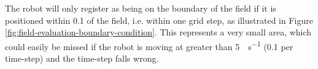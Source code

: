 \documentclass[10pt]{article}
\begin{document}
The robot will only register as being on the boundary of the field if it is
positioned within \SI{0.1}{\inch} of the field, i.e. within one grid step, as
illustrated in Figure \ref{fig:field-evaluation-boundary-condition}.  This
represents a very small area, which could easily be missed if the robot is
moving at greater than \SI{5}{\inch\per\second} (\SI{0.1}{\inch} per time-step)
and the time-step falls wrong.

\begin{figure}
  \centering

\end{figure}
\end{document}

